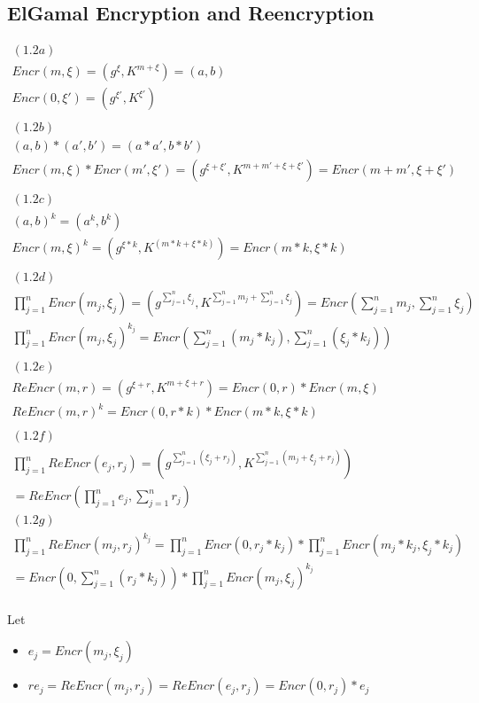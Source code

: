 \documentclass{article}
\begin{document}
\subsection{ElGamal Encryption and Reencryption}

\begin{align*}
(1.2a)\\
Encr(m,\xi)=(g^{\xi},K^{m+\xi})=(a,b)\\
Encr(0,\xi')=(g^{\xi'},K^{\xi'})\\
\\
(1.2b)\\
(a,b)*(a',b')=(a*a',b*b')\\
Encr(m,\xi)*Encr(m',\xi')=(g^{\xi+\xi'},K^{m+m'+\xi+\xi'})=Encr(m+m',\xi+\xi')\\
\\
(1.2c)\\
(a,b)^{k}=(a^{k},b^{k})\\
Encr(m,\xi)^{k}=(g^{\xi*k},K^{(m*k+\xi*k)})=Encr(m*k,\xi*k)\\
\\
(1.2d)\\
\prod_{j=1}^{n}Encr(m_{j},\xi_{j})=(g^{\sum_{j=1}^{n}\xi_{j}},K^{\sum_{j=1}^{n}m_{j}+\sum_{j=1}^{n}\xi_{j}})=Encr(\sum_{j=1}^{n}m_{j},\sum_{j=1}^{n}\xi_{j})\\
\prod_{j=1}^{n}Encr(m_{j},\xi_{j})^{k_{j}}=Encr(\sum_{j=1}^{n}(m_{j}*k_{j}),\sum_{j=1}^{n}(\xi_{j}*k_{j}))\\
\\
(1.2e)\\
ReEncr(m,r)=(g^{\xi+r},K^{m+\xi+r})=Encr(0,r)*Encr(m,\xi)\\
ReEncr(m,r)^{k}=Encr(0,r*k)*Encr(m*k,\xi*k)\\
\\
(1.2f)\\
\prod_{j=1}^{n}ReEncr(e_{j},r_{j})=(g^{\sum_{j=1}^{n}(\xi_{j}+r_{j})},K^{\sum_{j=1}^{n}(m_{j}+\xi_{j}+r_{j})})\\
=ReEncr(\prod_{j=1}^{n}e_{j},\sum_{j=1}^{n}r_{j})\\
(1.2g)\\
\prod_{j=1}^{n}ReEncr(m_{j},r_{j})^{k_{j}}=\prod_{j=1}^{n}Encr(0,r_{j}*k_{j})*\prod_{j=1}^{n}Encr(m_{j}*k_{j},\xi_{j}*k_{j})\\
=Encr(0,\sum_{j=1}^{n}(r_{j}*k_{j}))*\prod_{j=1}^{n}Encr(m_{j},\xi_{j})^{k_{j}}\\
\end{align*}

Let
\begin{itemize}
\item $e_{j}=Encr(m_{j},\xi_{j})$ 
\item $re_{j}=ReEncr(m_{j},r_{j})=ReEncr(e_{j},r_{j})=Encr(0,r_{j})*e_{j}$ 
\end{itemize}
\end{document}
